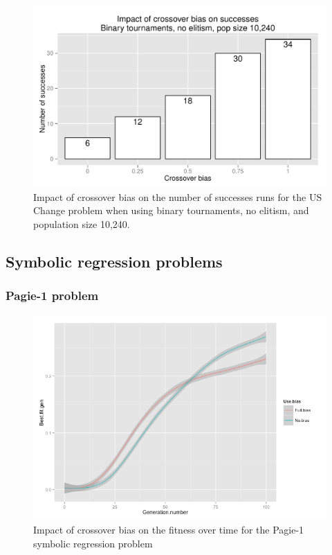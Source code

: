 \documentclass{sig-alternate}
\begin{document}
\begin{figure}
\centering
\includegraphics[width=0.45 \textwidth]{Plots/US_change_successes_strong.pdf}
\caption{Impact of crossover bias on the number of successes runs for the US Change problem when using 
binary tournaments, no elitism, and population size 10,240.}
\label{fig:USChange_Successes_strong}
\end{figure}

%
%
%
%


\subsection{Symbolic regression problems}

\subsubsection{Pagie-1 problem}

\begin{figure}
\centering
\includegraphics[width=0.45 \textwidth]{Plots/Pagie-1_fitness_vs_time.png}
\caption{Impact of crossover bias on the fitness over time for the Pagie-1 symbolic regression problem}
\label{fig:Pagie1FitnessOverTime}
\end{figure}
\end{document}
